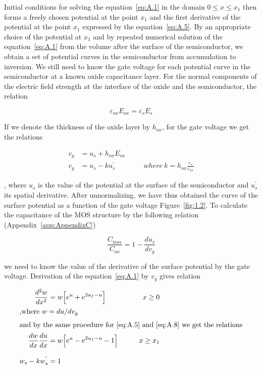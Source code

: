 Initial conditions for solving the equation~\ref{eq:A.1} in the domain
${0\leq{x}\leq{x_1}}$ then forms a freely chosen potential at the
point $x_1$ and the first derivative of the potential at the point
$x_1$ expressed by the equation~\ref{eq:A.5}. By an appropriate choice
of the potential at $x_1$ and by repeated numerical solution of the
equation~\ref{eq:A.1} from the volume after the surface of the
semiconductor, we obtain a set of potential curves in the
semiconductor from accumulation to inversion. We still need to know
the gate voltage for each potential curve in the semiconductor at a
known oxide capacitance layer.  For the normal components of the
electric field strength at the interface of the oxide and the
semiconductor, the relation

\begin{equation}\label{eq:A.6}
  \varepsilon_{ox}E_{ox} = \varepsilon_s{E_s}
\end{equation}

If we denote the thickness of the oxide layer by $h_{ox}$, for the
gate voltage we get the relations

\begin{align}
  v_g &= u_s + h_{ox}E_{ox} \label{eq:A.7} \\
  v_g &= u_s - ku_{s}^{'} \qquad\qquad where\ {k = h_{ox}\frac{\varepsilon_s}{\varepsilon_{ox}}} \label{eq:A.8}
\end{align}

, where $u_s$ is the value of the potential at the surface of the
semiconductor and $u_{s}^{'}$ its spatial derivative. After
unnormalizing, we have thus obtained the curve of the surface
potential as a function of the gate voltage Figure~\ref{fig:1.2}. To
calculate the capacitance of the MOS structure by the following
relation (Appendix~\ref{app:AppendixC})

\begin{equation}\label{eq:A.9}
  \frac{C_{mos}}{C_{ox}} = 1 - \frac{du_s}{dv_g}
\end{equation}

we need to know the value of the derivative of the surface potential
by the gate voltage. Derivation of the equation~\ref{eq:A.1} by $v_g$
gives relation

\begin{samepage}
  \begin{subequations}\label{eq:A.10}
    \begin{align}
      \frac{d^{2}w}{dx^2} &= w \Big[e^u + e^{2u_f-u}\Big] \qquad &{x\ge{0}} \label{eq:A.10a} \\
      \intertext{,where\ $w={du}/{dv_g}$}
      \intertext{and by the same procedure for~\ref{eq:A.5} and~\ref{eq:A.8} we get the relations}
      \frac{dw}{dx}\frac{du}{dx} &= w \Big[e^u - e^{2u_f-u} - 1\Big] \qquad &{x\ge{x_1}} \label{eq:A.10b} \\[0.3cm]
      w_s - kw_s^{'} &= 1 \label{eq:A.10c}
    \end{align}
  \end{subequations}
\end{samepage}

